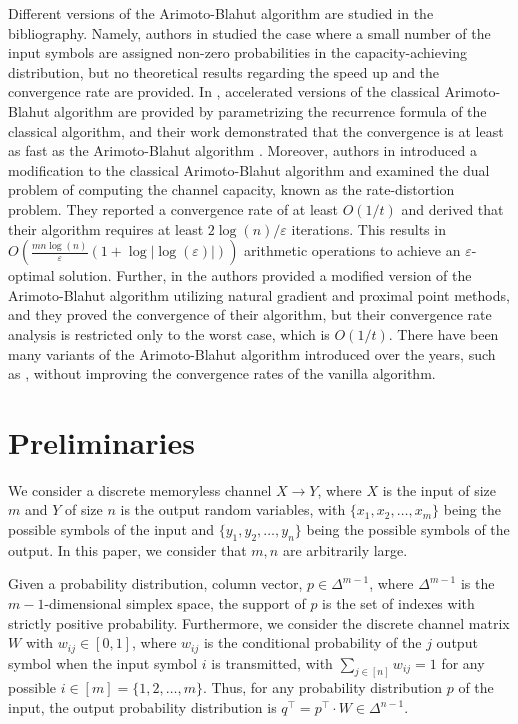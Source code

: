 \documentclass[11pt, letterpaper]{article}
\begin{document}
Different versions of the Arimoto-Blahut algorithm are studied in the bibliography. Namely, authors in \cite{Sayir2000IteratingTA} studied the case where a small number of the input symbols are assigned non-zero probabilities in the capacity-achieving distribution, but no theoretical results regarding the speed up and the convergence rate are provided. In \cite{Yu2009SqueezingTA}, accelerated versions of the classical Arimoto-Blahut algorithm are provided by parametrizing the recurrence formula of the classical algorithm, and their work demonstrated that the convergence is at least as fast as the Arimoto-Blahut algorithm \cite{Arimoto1972AnAF}. Moreover, authors in \cite{Chen2023ACB} introduced a modification to the classical Arimoto-Blahut algorithm and examined the dual problem of computing the channel capacity, known as the rate-distortion problem. They reported a convergence rate of at least $O(1/t)$ and derived that their algorithm requires at least ${2\log(n)}/{\varepsilon}$ iterations. This results in $O\left(\frac{mn \log(n)}{\varepsilon} \left(1 + \log|\log(\varepsilon)|\right)\right)$ arithmetic operations to achieve an $\varepsilon$-optimal solution. Further, in \cite{Matz2004InformationGF} the authors provided a modified version of the Arimoto-Blahut algorithm utilizing natural gradient and proximal point methods, and they proved the convergence of their algorithm, but their convergence rate analysis is restricted only to the worst case, which is $O(1/t)$. There have been many variants of the Arimoto-Blahut algorithm introduced over the years, such as \cite{Vontobel2008AGO}, without improving the convergence rates of the vanilla algorithm.

\section{Preliminaries}

We consider a discrete memoryless channel $X\to Y$, where $X$ is the input of size $m$ and $Y$ of size $n$ is the output random variables, with $\{x_1,x_2,\dots,x_m\}$ being the possible symbols of the input and $\{y_1,y_2,\dots,y_n\}$ being the possible symbols of the output. In this paper, we consider that $m,n$ are arbitrarily large.

Given a probability distribution, column vector, $p \in \Delta^{m-1}$, where $\Delta^{m-1}$ is the $m-1$-dimensional simplex space, the support of $p$ is the set of indexes with strictly positive probability. Furthermore, we consider the discrete channel matrix $W$ with $w_{ij} \in [0,1]$, where $w_{ij}$ is the conditional probability of the $j$ output symbol when the input symbol $i$ is transmitted, with $\sum_{j \in [n]} w_{ij} =1$ for any possible $i \in [m] = \{1,2,\dots, m\}$. Thus, for any probability distribution $p$ of the input, the output probability distribution is $q^{\top} = p^{\top}\cdot W\in \Delta^{n-1}$. 
\end{document}

